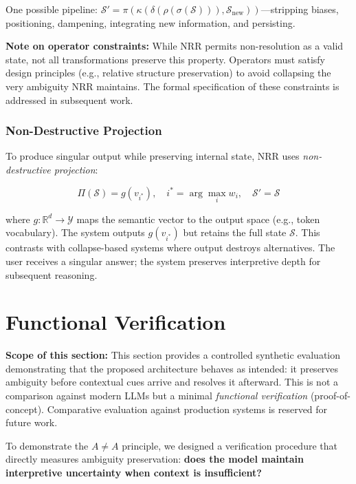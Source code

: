\documentclass[11pt,a4paper]{article}
\begin{document}
One possible pipeline: $\mathcal{S}' = \pi(\kappa(\delta(\rho(\sigma(\mathcal{S}))), \mathcal{S}_{\text{new}}))$---stripping biases, positioning, dampening, integrating new information, and persisting.

\textbf{Note on operator constraints:} While NRR permits non-resolution as a valid state, not all transformations preserve this property. Operators must satisfy design principles (e.g., relative structure preservation) to avoid collapsing the very ambiguity NRR maintains. The formal specification of these constraints is addressed in subsequent work.

\subsubsection{Non-Destructive Projection}

To produce singular output while preserving internal state, NRR uses \textit{non-destructive projection}:

\begin{equation}
\Pi(\mathcal{S}) = g(v_{i^*}), \quad i^* = \arg\max_i w_i, \quad \mathcal{S}' = \mathcal{S}
\end{equation}

where $g: \mathbb{R}^d \to \mathcal{Y}$ maps the semantic vector to the output space (e.g., token vocabulary). The system outputs $g(v_{i^*})$ but retains the full state $\mathcal{S}$. This contrasts with collapse-based systems where output destroys alternatives. The user receives a singular answer; the system preserves interpretive depth for subsequent reasoning.

\section{Functional Verification}
\label{sec:minimal_experiment}

\textbf{Scope of this section:} This section provides a controlled synthetic evaluation demonstrating that the proposed architecture behaves as intended: it preserves ambiguity before contextual cues arrive and resolves it afterward. This is not a comparison against modern LLMs but a minimal \textit{functional verification} (proof-of-concept). Comparative evaluation against production systems is reserved for future work.

\vspace{0.5em}

To demonstrate the $A \neq A$ principle, we designed a verification procedure that directly measures ambiguity preservation: \textbf{does the model maintain interpretive uncertainty when context is insufficient?}
\end{document}
